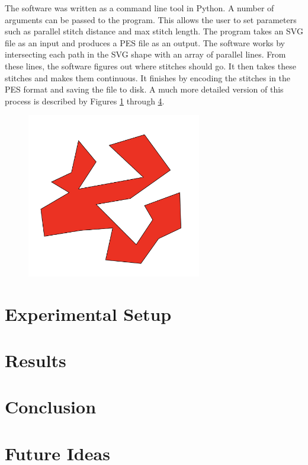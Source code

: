 \documentclass{article}
\begin{document}
The software was written as a command line tool in Python. A number of arguments can be passed to the program. This allows the user to set parameters such as parallel stitch distance and max stitch length. The program takes an SVG file as an input and produces a PES file as an output. The software works by intersecting each path in the SVG shape with an array of parallel lines. From these lines, the software figures out where stitches should go. It then takes these stitches and makes them continuous. It finishes by encoding the stitches in the PES format and saving the file to disk. A much more detailed version of this process is described by Figures \ref{p-1} through \ref{}.

\begin{figure}[H]
    \centering
    \includegraphics[width=3in]{p-1}
    \caption{}
    \label{p-1}
\end{figure}


\section{Experimental Setup}

\section{Results}

\section{Conclusion}

\section{Future Ideas}



\end{document}
